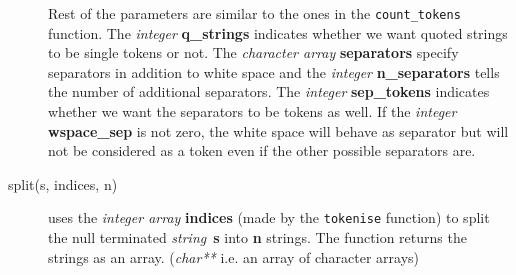 \documentclass[12pt,a4paper]{report}
\newcommand{\cdatatype}[1]{{\it #1}}
\newcommand{\cparameter}[1]{\textbf{#1}}
\newcommand{\cfunction}[1]{\texttt{#1}}
\begin{document}
\begin{description}
Rest of the parameters are similar to the ones in the 
\cfunction{count\_tokens} function. The \cdatatype{integer} 
\cparameter{q\_strings} indicates whether we want quoted strings to 
be single tokens or not. The \cdatatype{character array} 
\cparameter{separators} specify separators in addition to white space 
and the \cdatatype{integer} \cparameter{n\_separators} tells the 
number of additional separators. The \cdatatype{integer} 
\cparameter{sep\_tokens} indicates whether we want the
separators to be tokens as well. If the \cdatatype{integer}
\cparameter{wspace\_sep} is not zero, the white space will behave as
separator but will not be considered as a token even if the other
possible separators are.

\item[split(s, indices, n)] uses the \cdatatype{integer array}
\cparameter{indices} (made by the \cfunction{tokenise} function) to
split the null terminated \cdatatype{string}~\cparameter{s} into 
\cparameter{n} strings. The function returns the strings as an array. 
(\cdatatype{char**} i.e. an array of character arrays)
\end{description}
\end{document}
